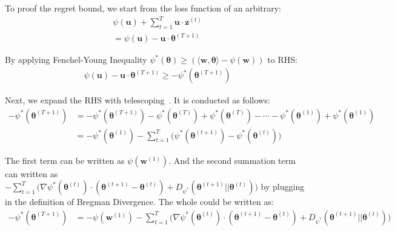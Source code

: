 \documentclass[11pt]{article}
\newcommand{\btheta}{\boldsymbol{\theta}}
\begin{document}
To proof the regret bound, we start from the loss function of an arbitrary:
\begin{equation*}
\begin{split}
\psi (\boldsymbol{u}) + \sum_{t=1}^T \boldsymbol{u} \cdot \boldsymbol{z}^{(t)} \\
= \psi (\boldsymbol{u}) - \boldsymbol{u} \cdot \btheta^{(T+1)}
\end{split}
\end{equation*}

By applying Fenchel-Young Inequality $\psi^* (\boldsymbol{\theta}) \geq (\langle \boldsymbol{w}, \boldsymbol{\theta} \rangle - \psi (\boldsymbol{w}))$ to RHS:
\begin{equation*}
\begin{split}
\psi (\boldsymbol{u}) - \boldsymbol{u} \cdot \btheta^{(T+1)} \geq -\psi^*(\btheta^{(T+1)})
\end{split}
\end{equation*}

Next, we expand the RHS with telescoping~\cite{telescoping}. It is conducted as follows:
\begin{equation*}
\begin{split}
-\psi^*(\btheta^{(T+1)}) &= 
-\psi^*(\btheta^{(T+1)})
-\psi^*(\btheta^{(T)})
+\psi^*(\btheta^{(T)})
-\cdots
-\psi^*(\btheta^{(1)})
+\psi^*(\btheta^{(1)}) \\
&= -\psi^*(\btheta^{(1)}) 
-\sum^{T}_{t=1} \Big( \psi^*(\btheta^{(t+1)}) - \psi^*(\btheta^{(t)}) \Big)
\end{split}
\end{equation*}

The first term can be written as $\psi(\boldsymbol{w}^{(1)})$. And the second summation term can written as $-\sum_{t=1}^{T} \Big( \nabla \psi^*(\btheta^{(t)}) \cdot (\btheta^{(t+1)} - \btheta^{(t)}) + D_{\psi^*} (\btheta^{(t+1)} || \btheta^{(t)}) \Big)$ by plugging in the definition of Bregman Divergence. The whole could be written as:
\begin{equation*}
\begin{split}
-\psi^*(\btheta^{(T+1)}) &=
-\psi(\boldsymbol{w}^{(1)}) 
-\sum_{t=1}^{T} \Big( \nabla \psi^*(\btheta^{(t)}) \cdot (\btheta^{(t+1)} - \btheta^{(t)}) + D_{\psi^*} (\btheta^{(t+1)} || \btheta^{(t)}) \Big)
\end{split}
\end{equation*}
\end{document}
